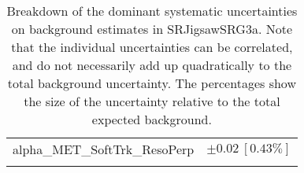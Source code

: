 \begin{table}
\begin{center}
\begin{tabular*}{\textwidth}{@{\extracolsep{\fill}}lc}
alpha\_MET\_SoftTrk\_ResoPerp         & $\pm 0.02\ [0.43\%] $       \\
\noalign{\smallskip}\hline\noalign{\smallskip}
\end{tabular*}
\end{center}
\caption[Breakdown of uncertainty on background estimates]{
Breakdown of the dominant systematic uncertainties on background estimates in SRJigsawSRG3a.
Note that the individual uncertainties can be correlated, and do not necessarily add up quadratically to 
the total background uncertainty. The percentages show the size of the uncertainty relative to the total expected background.
\label{table.results.bkgestimate.uncertainties.SRJigsawSRG3a}}
\end{table}
%